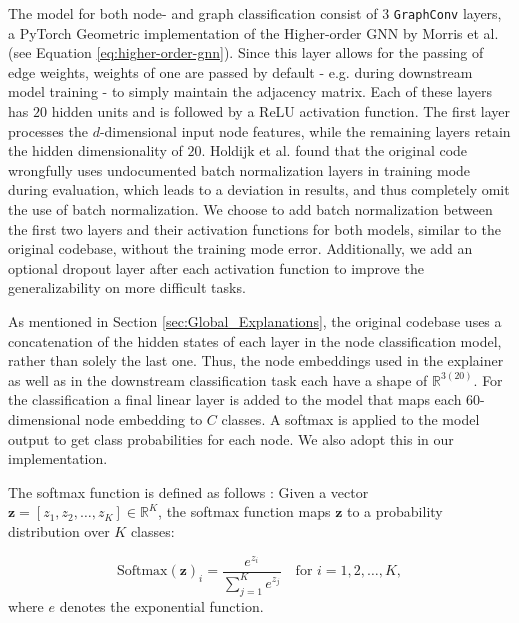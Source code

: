 The model for both node- and graph classification consist of $3$ \verb|GraphConv| layers, a PyTorch Geometric implementation of the Higher-order GNN by Morris et al. \cite{morris2019weisfeiler} (see Equation \ref{eq:higher-order-gnn}). Since this layer allows for the passing of edge weights, weights of one are passed by default - e.g. during downstream model training - to simply maintain the adjacency matrix. Each of these layers has $20$ hidden units and is followed by a ReLU activation function. The first layer processes the $d$-dimensional input node features, while the remaining layers retain the hidden dimensionality of $20$. Holdijk et al. \cite{holdijk2021re} found that the original code wrongfully uses undocumented batch normalization layers in training mode during evaluation, which leads to a deviation in results, and thus completely omit the use of batch normalization. We choose to add batch normalization between the first two layers and their activation functions for both models, similar to the original codebase, without the training mode error. Additionally, we add an optional dropout layer after each activation function to improve the generalizability on more difficult tasks.

As mentioned in Section \ref{sec:Global_Explanations}, the original codebase uses a concatenation of the hidden states of each layer in the node classification model, rather than solely the last one. Thus, the node embeddings used in the explainer as well as in the downstream classification task each have a shape of $\mathbb{R}^{3(20)}$. For the classification a final linear layer is added to the model that maps each $60$-dimensional node embedding to $C$ classes. A softmax is applied to the model output to get class probabilities for each node. We also adopt this in our implementation.

The softmax function is defined as follows \cite{Goodfellow-et-al-2016}:
Given a vector \( \mathbf{z} = [z_1, z_2, \dots, z_K] \in \mathbb{R}^K \), the softmax function maps \( \mathbf{z} \) to a probability distribution over \( K \) classes:

\begin{equation}
    \text{Softmax}(\mathbf{z})_i = \frac{e^{z_i}}{\sum_{j=1}^{K} e^{z_j}} \quad \text{for } i = 1, 2, \dots, K,
\end{equation}
where $e$ denotes the exponential function.

